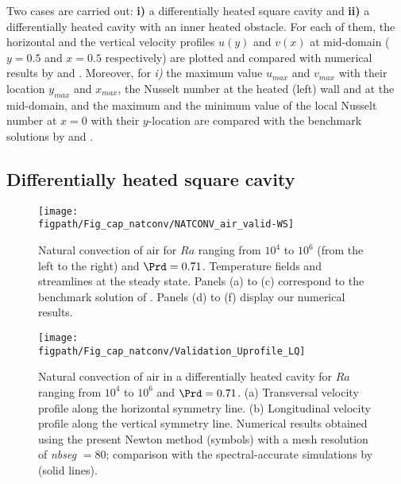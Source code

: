 Two cases are carried out: \textbf{ i)} a differentially heated square cavity and \textbf{ ii)} a differentially heated cavity with an inner heated obstacle.
For each of them, the horizontal and the vertical velocity profiles $u(y)$ and $v(x)$ at mid-domain ($y=0.5$ and $x=0.5$ respectively) are plotted and compared with numerical results by \cite{LeQuere91} and \cite{Raluca2013}. 
Moreover, for \textit{ i)} the maximum value $u_{max}$ and $v_{max}$ with their location $y_{max}$ and $x_{max}$, the Nusselt number at the heated (left) wall and  at the mid-domain, and the maximum and the minimum value of the local Nusselt number at $x=0$ with their $y$-location are compared with the benchmark solutions by \cite{de1983natural} and \cite{LeQuere91}.

\subsection{Differentially heated square cavity} \label{sub-diff-heated}

\begin{figure}
	\begin{center}
		\texttt{[image: \\figpath/Fig\_cap\_natconv/NATCONV\_air\_valid-WS]} 
	\end{center}
	\caption{Natural convection of air for $Ra$ ranging from $10^4$ to $10^6$ (from the left to the right) and $\Prd = 0.71$. Temperature fields and streamlines at the steady state. Panels (a) to (c) correspond to the benchmark solution of \cite{Wakashima-2004}. Panels (d) to (f) display our numerical results.}
	\label{fig-natconv-field}
\end{figure}


\begin{figure}
	\begin{center}
		\texttt{[image: \\figpath/Fig\_cap\_natconv/Validation\_Uprofile\_LQ]} 
	\end{center}
	\caption{Natural convection of air in a differentially heated cavity for $Ra$ ranging from $10^4$ to $10^6$ and $\Prd = 0.71$. (a) Transversal velocity profile along the  horizontal symmetry line. (b) Longitudinal velocity profile along the vertical symmetry line. Numerical results obtained using the present Newton method (symbols) with a mesh resolution of {\em nbseg} $=80$; comparison with the spectral-accurate simulations by \cite{LeQuere91} (solid lines).}
	\label{fig-T1-prof}
\end{figure}



